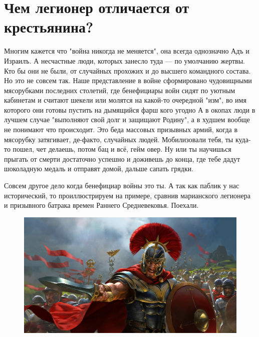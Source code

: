 \chapter{Чем легионер отличается от крестьянина?}

Многим кажется что "война никогда не меняется", она всегда однозначно Адъ и Израилъ. А несчастные люди, которых занесло туда — по умолчанию жертвы. Кто бы они не были, от случайных прохожих и до высшего командного состава. Но это не совсем так. Наше представление в войне сформировано чудовищными мясорубками последних столетий, где бенефициары войн сидят по уютным кабинетам и считают шекели или молятся на какой-то очередной "изм", во имя которого они готовы пустить на дымящийся фарш кого угодно А в окопах люди в лучшем случае "выполняют свой долг и защищают Родину", а в худшем вообще не понимают что происходит. Это беда массовых призывных армий, когда в мясорубку затягивает, де-факто, случайных людей. Мобилизовали тебя, ты куда-то пошел, чет делаешь, потом бац и всё, гейм овер. Ну или ты научишься прыгать от смерти достаточно успешно и доживешь до конца, где тебе дадут шоколадную медаль и отправят домой, дальше сапать грядки.


Совсем другое дело когда бенефициар войны это ты. А так как паблик у нас исторический, то проиллюстрируем на примере, сравнив марианского легионера и призывного батрака времен Раннего Средневековья. Поехали. 	

\begin{figure}[h!tb]
	\centering\includegraphics[scale=0.3]{Legioner/1594657934178989633.png}
	\label{fig:leg1} %
\end{figure}



